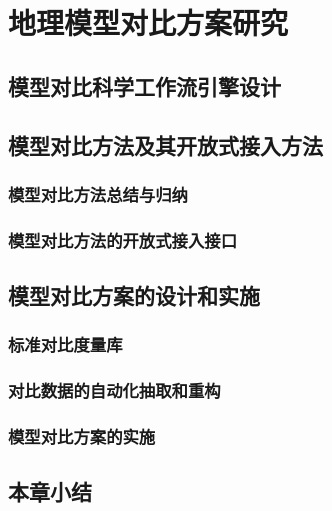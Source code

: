 \chapter{地理模型对比方案研究}

\section{模型对比科学工作流引擎设计}

\section{模型对比方法及其开放式接入方法}

\subsection{模型对比方法总结与归纳}

\subsection{模型对比方法的开放式接入接口}

\section{模型对比方案的设计和实施}
\subsection{标准对比度量库}

\subsection{对比数据的自动化抽取和重构}

\subsection{模型对比方案的实施}

\section{本章小结}
